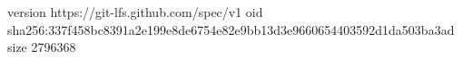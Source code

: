 version https://git-lfs.github.com/spec/v1
oid sha256:337f458bc8391a2e199e8de6754e82e9bb13d3e9660654403592d1da503ba3ad
size 2796368
